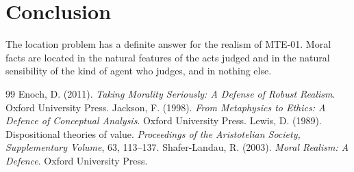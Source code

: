\documentclass{situationist-preprint}
\begin{document}
\section{Conclusion}

The location problem has a definite answer for the realism of MTE-01. Moral facts are located in the natural features of the acts judged and in the natural sensibility of the kind of agent who judges, and in nothing else.

\begin{thebibliography}{99}\small
{} Enoch, D. (2011). \emph{Taking Morality Seriously: A Defense of Robust Realism}. Oxford University Press.
 Jackson, F. (1998). \emph{From Metaphysics to Ethics: A Defence of Conceptual Analysis}. Oxford University Press.
 Lewis, D. (1989). Dispositional theories of value. \emph{Proceedings of the Aristotelian Society, Supplementary Volume}, 63, 113--137.
 Shafer-Landau, R. (2003). \emph{Moral Realism: A Defence}. Oxford University Press.
\end{thebibliography}
\end{document}
